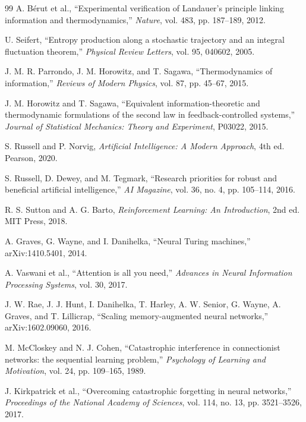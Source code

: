 \documentclass[10pt,a4paper,twocolumn,aps,prl]{revtex4-2}
\begin{document}
\begin{thebibliography}{99}
A. B\'{e}rut et al., ``Experimental verification of Landauer's principle linking information and thermodynamics,'' \emph{Nature}, vol. 483, pp. 187--189, 2012.

U. Seifert, ``Entropy production along a stochastic trajectory and an integral fluctuation theorem,'' \emph{Physical Review Letters}, vol. 95, 040602, 2005.

J. M. R. Parrondo, J. M. Horowitz, and T. Sagawa, ``Thermodynamics of information,'' \emph{Reviews of Modern Physics}, vol. 87, pp. 45--67, 2015.

J. M. Horowitz and T. Sagawa, ``Equivalent information-theoretic and thermodynamic formulations of the second law in feedback-controlled systems,'' \emph{Journal of Statistical Mechanics: Theory and Experiment}, P03022, 2015.

S. Russell and P. Norvig, \emph{Artificial Intelligence: A Modern Approach}, 4th ed. Pearson, 2020.

S. Russell, D. Dewey, and M. Tegmark, ``Research priorities for robust and beneficial artificial intelligence,'' \emph{AI Magazine}, vol. 36, no. 4, pp. 105--114, 2016.

R. S. Sutton and A. G. Barto, \emph{Reinforcement Learning: An Introduction}, 2nd ed. MIT Press, 2018.

A. Graves, G. Wayne, and I. Danihelka, ``Neural Turing machines,'' arXiv:1410.5401, 2014.

A. Vaswani et al., ``Attention is all you need,'' \emph{Advances in Neural Information Processing Systems}, vol. 30, 2017.

J. W. Rae, J. J. Hunt, I. Danihelka, T. Harley, A. W. Senior, G. Wayne, A. Graves, and T. Lillicrap, ``Scaling memory-augmented neural networks,'' arXiv:1602.09060, 2016.

M. McCloskey and N. J. Cohen, ``Catastrophic interference in connectionist networks: the sequential learning problem,'' \emph{Psychology of Learning and Motivation}, vol. 24, pp. 109--165, 1989.

J. Kirkpatrick et al., ``Overcoming catastrophic forgetting in neural networks,'' \emph{Proceedings of the National Academy of Sciences}, vol. 114, no. 13, pp. 3521--3526, 2017.


\end{thebibliography}
\end{document}
